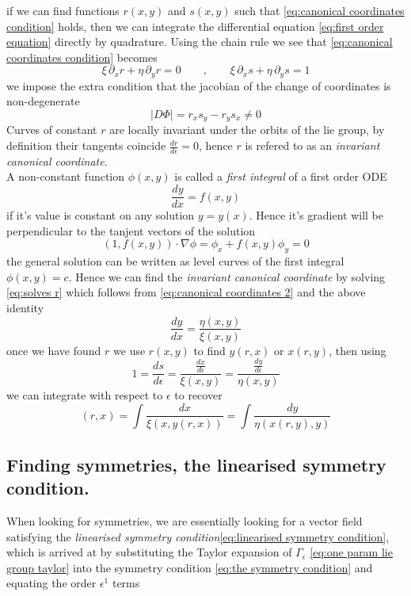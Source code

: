 \documentclass[12pt]{article}
\begin{document}
if we can find functions $r(x,y)$ and $s(x,y)$ such that \eqref{eq:canonical coordinates condition} holds, then we can integrate the differential equation \eqref{eq:first order equation} directly by quadrature. Using the chain rule we see that \eqref{eq:canonical coordinates condition} becomes
\begin{equation}\label{eq:canonical coordinates 2}
    \xi\,\partial_xr + \eta\,\partial_yr = 0\qquad,\qquad \xi\,\partial_xs + \eta\,\partial_ys = 1
\end{equation}
we impose the extra condition that the jacobian of the change of coordinates is non-degenerate
$$
\left|D\Phi \right| = r_xs_y - r_ys_x \neq 0
$$
Curves of constant $r$ are locally invariant under the orbits of the lie group, by definition their tangents coincide $\frac{dr}{d\epsilon}=0$, hence $r$ is refered to as an \textit{invariant canonical coordinate}. \\

A non-constant function $\phi(x,y)$ is called a \textit{first integral} of a first order ODE 
$$\frac{dy}{dx} = f(x,y)$$
if it's value is constant on any solution $y=y(x)$. Hence it's gradient will be perpendicular to the tanjent vectors of the solution
$$(1,f(x,y)) \cdot \nabla \phi = \phi_x + f(x,y)\phi_y = 0$$
the general solution can be written as level curves of the first integral $\phi(x,y)=c$. Hence we can find the \textit{invariant canonical coordinate} by solving \eqref{eq:solves r} which follows from \eqref{eq:canonical coordinates 2} and the above identity
\begin{equation}\label{eq:solves r}
    \frac{dy}{dx} = \frac{\eta(x,y)}{\xi(x,y)}
\end{equation}
once we have found $r$ we use $r(x,y)$ to find $y(r,x)$ or $x(r,y)$, then using 
$$1 = \frac{ds}{d\epsilon} = \frac{\frac{dx}{d\epsilon}}{\xi(x,y)} = \frac{\frac{dy}{d\epsilon}}{\eta(x,y)}$$
we can integrate with respect to $\epsilon$ to recover  
\begin{equation}\label{eq:solving for s}(r,x) = \int \frac{dx}{\xi(x,y(r,x))} = \int \frac{dy}{\eta(x(r,y),y)}\end{equation} 

\subsection{Finding symmetries, the linearised symmetry condition.}

When looking for symmetries, we are essentially looking for a vector field satisfying  the \textit{linearised symmetry condition}\eqref{eq:linearised symmetry condition}, which is arrived at by substituting the Taylor expansion of $\Gamma_\epsilon$ \eqref{eq:one param lie group taylor} into the symmetry condition \eqref{eq:the symmetry condition} and equating the order $\epsilon^1$ terms
\end{document}
